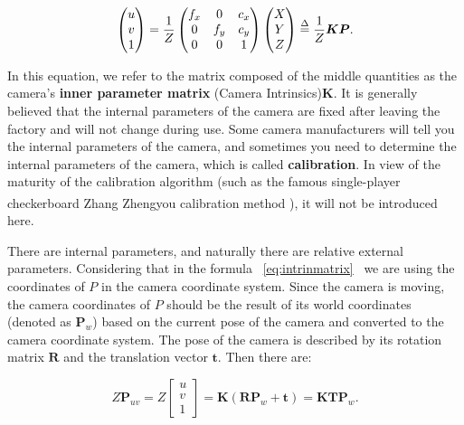 \begin{equation}
\label{eq:intrinmatrix} 
\begin{pmatrix} u\\ v\\ 1 \end{pmatrix}=\frac{1}{Z}\begin{pmatrix} f_x & 0&c_x \\ 0& f_y& c_y\\ 0&0 & 1 \end{pmatrix}\begin{pmatrix} X\\ Y\\ Z \end{pmatrix} 
\buildrel \Delta \over =\frac{1}{Z} \bm{K} \bm{P}.
\end{equation}

In this equation, we refer to the matrix composed of the middle quantities as the camera's \textbf{inner parameter matrix} (Camera Intrinsics)$\bm{K}$. It is generally believed that the internal parameters of the camera are fixed after leaving the factory and will not change during use. Some camera manufacturers will tell you the internal parameters of the camera, and sometimes you need to determine the internal parameters of the camera, which is called \textbf{calibration}. In view of the maturity of the calibration algorithm (such as the famous single-player checkerboard Zhang Zhengyou calibration method \textsuperscript{\cite{Zhang1999}}), it will not be introduced here.

There are internal parameters, and naturally there are relative external parameters. Considering that in the formula ~\eqref{eq:intrinmatrix}~ we are using the coordinates of $P$ in the camera coordinate system. Since the camera is moving, the camera coordinates of $P$ should be the result of its world coordinates (denoted as $\bm{P}_w$) based on the current pose of the camera and converted to the camera coordinate system. The pose of the camera is described by its rotation matrix $\bm{R}$ and the translation vector $\bm{t}$. Then there are:

\begin{equation}
\label{eq:cameraprojection}
Z \bm{P}_{uv}=
Z \left[ \begin{array}{l}
u\\
v\\
1
\end{array} \right] = \bm{K} \left( {\bm{R}{ \bm{P}_w} + \bm{t}} \right) =  \bm{K} \bm{T} \bm{P}_w .
\end{equation}

